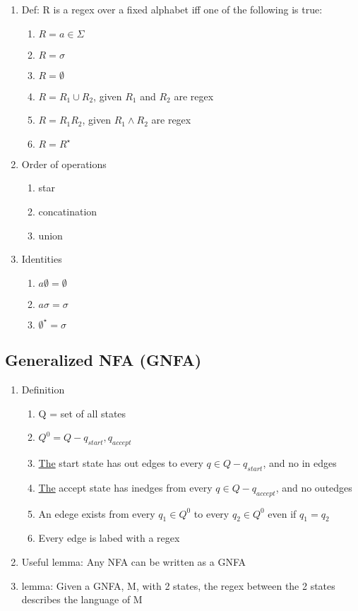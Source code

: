 \documentclass[11pt]{article}
\begin{document}
\begin{enumerate}
\item Def: R is a regex over a fixed alphabet iff one of the
      following is true:

\begin{enumerate}
\item $R=a\in\Sigma$
\item $R=\sigma$
\item $R=\emptyset$
\item $R=R_1\cup R_2$, given $R_1$ and $R_2$ are regex
\item $R = R_1 R_2$, given $R_1 \wedge R_2$ are regex
\item $R = R^{\star}$
\end{enumerate}

\item Order of operations

\begin{enumerate}
\item star
\item concatination
\item union
\end{enumerate}

\item Identities

\begin{enumerate}
\item $a \emptyset = \emptyset$
\item $a \sigma = \sigma$
\item $\emptyset^{\star} = {\sigma}$
\end{enumerate}

\end{enumerate}
\subsection{Generalized NFA (GNFA)}
\label{sec-2.4}

\begin{enumerate}
\item Definition

\begin{enumerate}
\item Q = set of all states
\item $Q^0 = Q - {q_{start}, q_{accept}}$
\item \underline{The} start state has out edges to every $q\in Q - {q_{start}}$, and
         no in edges
\item \underline{The} accept state has inedges from every $q\in Q - {q_{accept}}$,
         and no outedges
\item An edege exists from every $q_1\in Q^0$ to every $q_2\in Q^0$
         even if $q_1=q_2$
\item Every edge is labed with a regex
\end{enumerate}

\item Useful lemma: Any NFA can be written as a GNFA
\item lemma: Given a GNFA, M,  with 2 states, the regex between the 2
      states describes the language of M
\end{enumerate}
\end{document}
